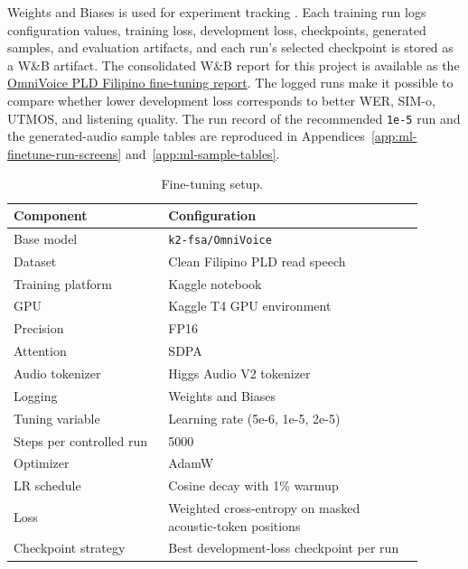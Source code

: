 \documentclass[11pt]{article}
\begin{document}
Weights and Biases is used for experiment tracking \citep{wandb}. Each training run logs configuration values, training loss, development loss, checkpoints, generated samples, and evaluation artifacts, and each run's selected checkpoint is stored as a W\&B artifact. The consolidated W\&B report for this project is available as the \href{https://wandb.ai/duncanb013-polytechnic-university-of-the-philippines/OmniVoice-PLD-Filipino/reports/OmniVoice-PLD-Filipino-finetuning--VmlldzoxNjk0ODkyMg?accessToken=ktcztpc3ocu4gmtctis13mdubb82ec1r4rnyuxdta56tts4z5j4f965olbm0v5ka}{OmniVoice PLD Filipino fine-tuning report}. The logged runs make it possible to compare whether lower development loss corresponds to better WER, SIM-o, UTMOS, and listening quality. The run record of the recommended \texttt{1e-5} run and the generated-audio sample tables are reproduced in Appendices~\ref{app:ml-finetune-run-screens} and~\ref{app:ml-sample-tables}.

\begin{table}[H]
  \centering
  \caption{Fine-tuning setup.}
  \begin{tabular}{P{0.34\linewidth}P{0.56\linewidth}}
    \toprule
    Component & Configuration \\
    \midrule
    Base model & \texttt{k2-fsa/OmniVoice} \\
    Dataset & Clean Filipino PLD read speech \\
    Training platform & Kaggle notebook \\
    GPU & Kaggle T4 GPU environment \\
    Precision & FP16 \\
    Attention & SDPA \\
    Audio tokenizer & Higgs Audio V2 tokenizer \\
    Logging & Weights and Biases \\
    Tuning variable & Learning rate (5e-6, 1e-5, 2e-5) \\
    Steps per controlled run & 5000 \\
    Optimizer & AdamW \\
    LR schedule & Cosine decay with 1\% warmup \\
    Loss & Weighted cross-entropy on masked acoustic-token positions \\
    Checkpoint strategy & Best development-loss checkpoint per run \\
    \bottomrule
  \end{tabular}
  \label{tab:training-setup}
\end{table}
\end{document}

